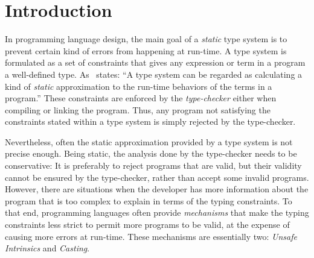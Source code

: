 
\chapter{Introduction}

In programming language design, the main goal of a \emph{static} type system is to prevent certain kind of errors from happening at run-time.
A type system is formulated as a set of constraints that gives any expression or term in a program a well-defined type.
As~\cite{pierceTypesProgrammingLanguages2002} states: ``A type system can be regarded as calculating a kind of \emph{static} approximation to the run-time behaviors of the terms in a program.''
These constraints are enforced by the \emph{type-checker} either when compiling or linking the program.
Thus, any program not satisfying the constraints stated within a type system is simply rejected by the type-checker.

Nevertheless, often the static approximation provided by a type system is not precise enough.
Being static, the analysis done by the type-checker needs to be conservative:
It is preferably to reject programs that are valid, but their validity cannot be ensured by the type-checker,
rather than accept some invalid programs.
However, there are situations when the developer has more information about the program that is too complex to explain in terms of the typing constraints.
To that end, programming languages often provide \emph{mechanisms} that 
make the typing constraints less strict
to permit more programs to be valid,
at the expense of causing more errors at run-time.
These mechanisms are essentially two:
\emph{Unsafe Intrinsics} and \emph{Casting}.

